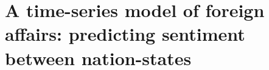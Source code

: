 \chapter{A time-series model of foreign affairs: predicting sentiment between nation-states}

\label{chapter:foreign_relations}










